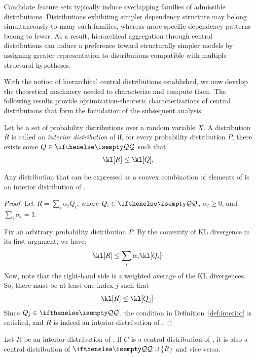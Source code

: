 Candidate feature sets typically induce overlapping families of admissible distributions.
Distributions exhibiting simpler dependency structure may belong simultaneously to many such families, whereas more
specific dependency patterns belong to fewer.
As a result, hierarchical aggregation through central distributions can induce a preference toward structurally
simpler models by assigning greater representation to distributions compatible with multiple structural hypotheses.

With the notion of hierarchical central distributions established, we now develop the theoretical machinery needed
to characterize and compute them.
The following results provide optimization-theoretic characterizations of central distributions that form the
foundation of the subsequent analysis.

\begin{definition}
    \label{def:interior}
    Let \setQ be a set of probability distributions over a random variable $X$.
    A distribution $R$ is called an \emph{interior distribution} of \setQ if, for every probability distribution $P$,
    there exists some $\inSet{Q}$ such that
    \begin{equation*}
        \kl[R] \leq \kl[Q],
    \end{equation*}
\end{definition}

\begin{theorem}
    Any distribution that can be expressed as a convex combination of elements of \setQ is an
    interior distribution of \setQ.
\end{theorem}

\begin{proof}
    Let $R = \sum_i \alpha_i Q_i$, where $Q_i \in \setQ$, $\alpha_i \geq 0$, and $\sum_i \alpha_i = 1$.

    Fix an arbitrary probability distribution $P$.
    By the convexity of KL divergence in its first argument, we have:
    \[
        \kl[R] \leq \sum_i \alpha_i \kl[Q_i] \cdot
    \]
    Now, note that the right-hand side is a weighted average of the KL divergences.
    So, there must be at least one index $j$ such that
    \[
        \kl[R] \leq \kl[Q_j] \cdot
    \]
    Since $Q_j \in \setQ$, the condition in Definition~\ref{def:interior} is satisfied,
    and $R$ is indeed an interior distribution of \setQ.
\end{proof}

\begin{theorem}
    Let $R$ be an interior distribution of \setQ.
    If $C$ is a central distribution of \setQ, it is also a central distribution of $\setQ \cup \{R\}$ and vice versa.
\end{theorem}

